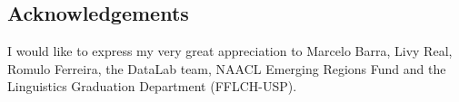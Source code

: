 \documentclass[a0,portrait]{a0poster}
\begin{document}
\begin{multicols}{2}
\color{DB}
\nocite{*} %

\color{DB}
\section*{Acknowledgements}
\color{darkgray}
I would like to express my very great appreciation to Marcelo Barra, Livy Real, Romulo Ferreira, the DataLab team, NAACL Emerging Regions Fund and the Linguistics Graduation Department (FFLCH-USP).


\end{multicols}
\end{document}
